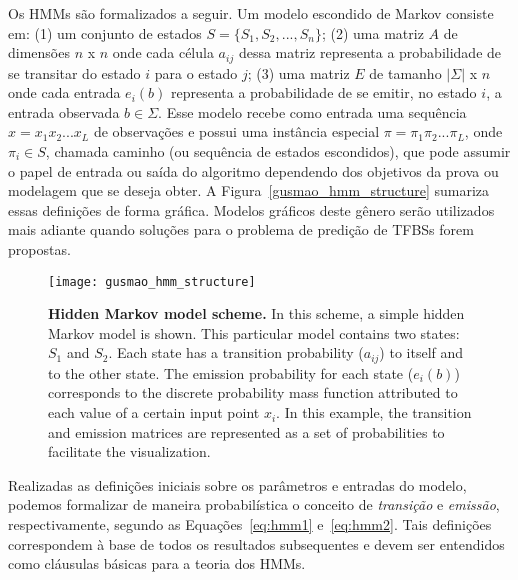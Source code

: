 Os HMMs são formalizados a seguir. Um modelo escondido de Markov consiste em: (1) um conjunto de estados $ S = \{ S_1, S_2, ..., S_n \} $; (2) uma matriz $ A $ de dimensões $ n $ x $ n $ onde cada célula $ a_{ij} $ dessa matriz representa a probabilidade de se transitar do estado $ i $ para o estado $ j $; (3) uma matriz $ E $ de tamanho $ |\Sigma| $ x $ n $ onde cada entrada $ e_i(b) $ representa a probabilidade de se emitir, no estado $ i $, a entrada observada $ b \in \Sigma $. Esse modelo recebe como entrada uma sequência $ x = x_1 x_2 ... x_L $ de observações e possui uma instância especial $ \pi = \pi_1 \pi_2 ... \pi_L $, onde $ \pi_i \in S $, chamada caminho (ou sequência de estados escondidos), que pode assumir o papel de entrada ou saída do algoritmo dependendo dos objetivos da prova ou modelagem que se deseja obter. A Figura~\ref{gusmao_hmm_structure} sumariza essas definições de forma gráfica. Modelos gráficos deste gênero serão utilizados mais adiante quando soluções para o problema de predição de TFBSs forem propostas.


\begin{figure}[h!]
\centering
\texttt{[image: gusmao\_hmm\_structure]}
\caption[Hidden Markov model scheme]{\textbf{Hidden Markov model scheme.} In this scheme, a simple hidden Markov model is shown. This particular model contains two states: $S_1$ and $S_2$. Each state has a transition probability ($a_{ij}$) to itself and to the other state. The emission probability for each state ($e_i(b)$) corresponds to the discrete probability mass function attributed to each value of a certain input point $x_i$. In this example, the transition and emission matrices are represented as a set of probabilities to facilitate the visualization.}
\label{fig:gusmao_hmm_structure}
\end{figure}

Realizadas as definições iniciais sobre os parâmetros e entradas do modelo, podemos formalizar de maneira probabilística o conceito de \emph{transição} e \emph{emissão}, respectivamente, segundo as Equações~\ref{eq:hmm1} e~\ref{eq:hmm2}. Tais definições correspondem à base de todos os resultados subsequentes e devem ser entendidos como cláusulas básicas para a teoria dos HMMs.

